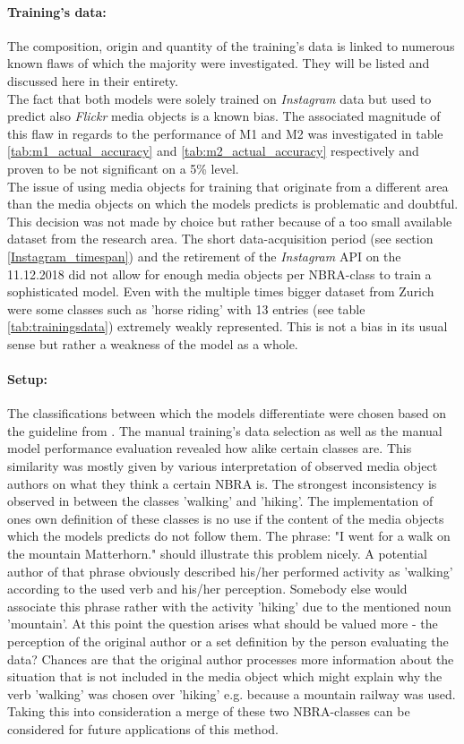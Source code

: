 \paragraph*{Training's data:} The composition, origin and quantity of the training's data is linked to numerous known flaws of which the majority were investigated. They will be listed and discussed here in their entirety. \\
The fact that both models were solely trained on \textit{Instagram} data but used to predict also \textit{Flickr} media objects is a known bias. The associated magnitude of this flaw in regards to the performance of M1 and M2 was investigated in table \ref{tab:m1_actual_accuracy} and \ref{tab:m2_actual_accuracy} respectively and proven to be not significant on a 5\% level. \\
The issue of using media objects for training that originate from a different area than the media objects on which the models predicts is problematic and doubtful. This decision was not made by choice but rather because of a too small available dataset from the research area. The short data-acquisition period (see section \ref{Instagram_timespan}) and the retirement of the \textit{Instagram} API on the 11.12.2018 did not allow for enough media objects per NBRA-class to train a sophisticated model. Even with the multiple times bigger dataset from Zurich were some classes such as 'horse riding' with 13 entries (see table \ref{tab:trainingsdata}) extremely weakly represented. This is not a bias in its usual sense but rather a weakness of the model as a whole.

\paragraph*{Setup:} 
The classifications between which the models differentiate were chosen based on the guideline from \parencite{IFL2018}. The manual training's data selection as well as the manual model performance evaluation revealed how alike certain classes are. This similarity was mostly given by various interpretation of observed media object authors on what they think a certain NBRA is. The strongest inconsistency is observed in between the classes 'walking' and 'hiking'. The implementation of ones own definition of these classes is no use if the content of the media objects which the models predicts do not follow them. The phrase: "I went for a walk on the mountain Matterhorn." should illustrate this problem nicely. A potential author of that phrase obviously described his/her performed activity as 'walking' according to the used verb and his/her perception. Somebody else would associate this phrase rather with the activity 'hiking' due to the mentioned noun 'mountain'. At this point the question arises what should be valued more - the perception of the original author or a set definition by the person evaluating the data? Chances are that the original author processes more information about the situation that is not included in the media object which might explain why the verb 'walking' was chosen over 'hiking' e.g. because a mountain railway was used. 
Taking this into consideration a merge of these two NBRA-classes can be considered for future applications of this method. 

